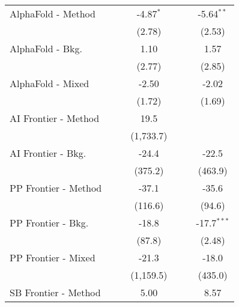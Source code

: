 \begin{tabular}{lcccccc}
   AlphaFold - Method           &               &            & -4.87$^{*}$ &               &             & -5.64$^{**}$\\   
                                &               &            & (2.78)      &               &             & (2.53)\\   
   AlphaFold - Bkg.             &               &            & 1.10        &               &             & 1.57\\   
                                &               &            & (2.77)      &               &             & (2.85)\\   
   AlphaFold - Mixed            &               &            & -2.50       &               &             & -2.02\\   
                                &               &            & (1.72)      &               &             & (1.69)\\   
   AI Frontier - Method         &               &            & 19.5        &               &             &   \\   
                                &               &            & (1,733.7)   &               &             &   \\   
   AI Frontier - Bkg.           &               &            & -24.4       &               &             & -22.5\\   
                                &               &            & (375.2)     &               &             & (463.9)\\   
   PP Frontier - Method         &               &            & -37.1       &               &             & -35.6\\   
                                &               &            & (116.6)     &               &             & (94.6)\\   
   PP Frontier - Bkg.           &               &            & -18.8       &               &             & -17.7$^{***}$\\   
                                &               &            & (87.8)      &               &             & (2.48)\\   
   PP Frontier - Mixed          &               &            & -21.3       &               &             & -18.0\\   
                                &               &            & (1,159.5)   &               &             & (435.0)\\   
   SB Frontier - Method         &               &            & 5.00        &               &             & 8.57\\   

\end{tabular}
